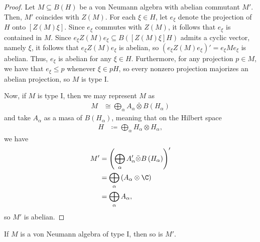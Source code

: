 \documentclass[10pt]{mypackage}
\renewcommand{\coloneq}{\coloneqq}
\begin{document}
\begin{proof}
  Let $M\subseteq B(H)$ be a von Neumann algebra with abelian commutant $M'$. Then, $M'$ coincides with $Z(M)$. For each $\xi\in H$, let $e_{\xi}$ denote the projection of $H$ onto $\left[ Z(M)\xi \right]$. Since $e_{\xi}$ commutes with $Z(M)$, it follows that $e_{\xi}$ is contained in $M$. Since $e_{\xi}Z(M)e_{\xi}\subseteq B\left( \left[ Z(M)\xi \right]H \right)$ admits a cyclic vector, namely $\xi$, it follows that $e_{\xi}Z(M)e_{\xi}$ is abelian, so $\left( e_{\xi}Z(M)e_{\xi} \right)' = e_{\xi}Me_{\xi}$ is abelian. Thus, $e_{\xi}$ is abelian for any $\xi\in H$. Furthermore, for any projection $p\in M$, we have that $e_{\xi}\leq p$ whenever $\xi\in pH$, so every nonzero projection majorizes an abelian projection, so $M$ is type I.

  Now, if $M$ is type I, then we may represent $M$ as
  \begin{align*}
    M &\cong \bigoplus_{\alpha}A_{\alpha}\bar\otimes B\left( H_{\alpha} \right)
  \end{align*}
  and take $A_{\alpha}$ as a masa of $B\left( H_{\alpha} \right)$, meaning that on the Hilbert space
  \begin{align*}
    H &\coloneq \bigoplus_{\alpha}H_{\alpha}\otimes H_{\alpha},
  \end{align*}
  we have
  \begin{align*}
    M' &= \left( \bigoplus_{\alpha}A'_{\alpha}\bar\otimes B\left( H_{\alpha} \right) \right)'\\
       &= \bigoplus_{\alpha} \left( A_{\alpha}\otimes \C \right)\\
       &= \bigoplus_{\alpha}A_{\alpha},
  \end{align*}
  so $M'$ is abelian.
\end{proof}
\begin{corollary}
  If $M$ is a von Neumann algebra of type I, then so is $M'$.
\end{corollary}
\end{document}
